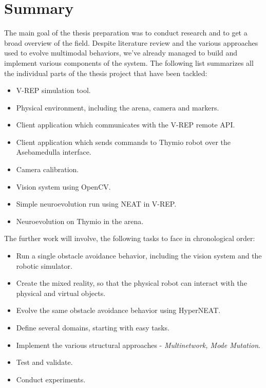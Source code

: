 \documentclass[format=acmsmall, review=false, screen=true]{acmart}
\begin{document}
\section{Summary}

The main goal of the thesis preparation was to conduct research and to get a broad overview of the field. Despite literature review and the various approaches used to evolve multimodal behaviors, we've already managed to build and implement various components of the system. The following list summarizes all the individual parts of the thesis project that have been tackled:

\begin{itemize}
  \item V-REP simulation tool.
  \item Physical environment, including the arena, camera and markers.
  \item Client application which communicates with the V-REP remote API.
  \item Client application which sends commands to Thymio robot over the Asebamedulla interface.
  \item Camera calibration.
  \item Vision system using OpenCV.
  \item Simple neuroevolution run using NEAT in V-REP.
  \item Neuroevolution on Thymio in the arena.
\end{itemize}

The further work will involve, the following tasks to face in chronological order:

\begin{itemize}
  \item Run a single obstacle avoidance behavior, including the vision system and the robotic simulator.
  \item Create the mixed reality, so that the physical robot can interact with the physical and virtual objects.
  \item Evolve the same obstacle avoidance behavior using HyperNEAT.
  \item Define several domains, starting with easy tasks.
  \item Implement the various structural approaches - \emph{Multinetwork, Mode Mutation}.
  \item Test and validate.
  \item Conduct experiments.
\end{itemize}


\medskip

\newpage


\end{document}

